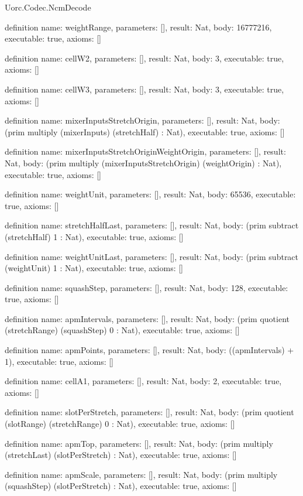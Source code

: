 \begin{lexlean}{Uorc.Codec.NcmDecode}
\begin{semanticmodule}
definition{
  name: weightRange,
  parameters: [],
  result: Nat,
  body: 16777216,
  executable: true,
  axioms: []
}

definition{
  name: cellW2,
  parameters: [],
  result: Nat,
  body: 3,
  executable: true,
  axioms: []
}

definition{
  name: cellW3,
  parameters: [],
  result: Nat,
  body: 3,
  executable: true,
  axioms: []
}

definition{
  name: mixerInputsStretchOrigin,
  parameters: [],
  result: Nat,
  body: (prim multiply (mixerInputs) (stretchHalf) : Nat),
  executable: true,
  axioms: []
}

definition{
  name: mixerInputsStretchOriginWeightOrigin,
  parameters: [],
  result: Nat,
  body: (prim multiply (mixerInputsStretchOrigin) (weightOrigin) : Nat),
  executable: true,
  axioms: []
}

definition{
  name: weightUnit,
  parameters: [],
  result: Nat,
  body: 65536,
  executable: true,
  axioms: []
}

definition{
  name: stretchHalfLast,
  parameters: [],
  result: Nat,
  body: (prim subtract (stretchHalf) 1 : Nat),
  executable: true,
  axioms: []
}

definition{
  name: weightUnitLast,
  parameters: [],
  result: Nat,
  body: (prim subtract (weightUnit) 1 : Nat),
  executable: true,
  axioms: []
}

definition{
  name: squashStep,
  parameters: [],
  result: Nat,
  body: 128,
  executable: true,
  axioms: []
}

definition{
  name: apmIntervals,
  parameters: [],
  result: Nat,
  body: (prim quotient (stretchRange) (squashStep) 0 : Nat),
  executable: true,
  axioms: []
}

definition{
  name: apmPoints,
  parameters: [],
  result: Nat,
  body: ((apmIntervals) + 1),
  executable: true,
  axioms: []
}

definition{
  name: cellA1,
  parameters: [],
  result: Nat,
  body: 2,
  executable: true,
  axioms: []
}

definition{
  name: slotPerStretch,
  parameters: [],
  result: Nat,
  body: (prim quotient (slotRange) (stretchRange) 0 : Nat),
  executable: true,
  axioms: []
}

definition{
  name: apmTop,
  parameters: [],
  result: Nat,
  body: (prim multiply (stretchLast) (slotPerStretch) : Nat),
  executable: true,
  axioms: []
}

definition{
  name: apmScale,
  parameters: [],
  result: Nat,
  body: (prim multiply (squashStep) (slotPerStretch) : Nat),
  executable: true,
  axioms: []
}


\end{semanticmodule}
\end{lexlean}
